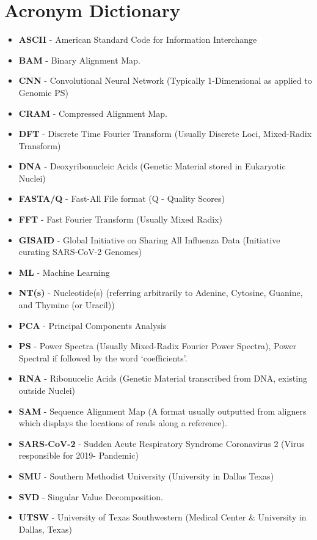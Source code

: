 \documentclass[10pt,conference]{IEEEtran}
\begin{document}
{\small
\section{Acronym Dictionary} 

\begin{itemize} 
\item \textbf{ASCII} - American Standard Code for Information Interchange
\item \textbf{BAM} - Binary Alignment Map. 
\item \textbf{CNN} - Convolutional Neural Network (Typically 1-Dimensional as applied to Genomic PS)
\item \textbf{CRAM} - Compressed Alignment Map.
\item \textbf{DFT} - Discrete Time Fourier Transform (Usually Discrete Loci, Mixed-Radix Transform)
\item \textbf{DNA} - Deoxyribonucleic Acids (Genetic Material stored in Eukaryotic Nuclei)
\item \textbf{FASTA/Q} - Fast-All File format (Q - Quality Scores)
\item \textbf{FFT} - Fast Fourier Transform (Usually Mixed Radix)
\item \textbf{GISAID} - Global Initiative on Sharing All Influenza Data (Initiative curating SARS-CoV-2 Genomes)
\item \textbf{ML} - Machine Learning
\item \textbf{NT(s)} - Nucleotide(s) (referring arbitrarily to Adenine, Cytosine, Guanine, and Thymine (or Uracil))
\item \textbf{PCA} - Principal Components Analysis
\item \textbf{PS} - Power Spectra (Usually Mixed-Radix Fourier Power Spectra), Power Spectral  if followed by the word `coefficients'. 
\item \textbf{RNA} - Ribonucelic Acids (Genetic Material transcribed from DNA, existing outside Nuclei)
\item \textbf{SAM} - Sequence Alignment Map (A format usually outputted from aligners which displays the locations of reads along a reference). 
\item \textbf{SARS-CoV-2} - Sudden Acute Respiratory Syndrome Coronavirus 2 (Virus responsible for 2019- Pandemic)
\item \textbf{SMU} - Southern Methodist University (University in Dallas Texas) 
\item \textbf{SVD} - Singular Value Decomposition.
\item \textbf{UTSW} - University of Texas Southwestern (Medical Center \& University in Dallas, Texas)
\end{itemize}
\vspace{-0.5 em}

}
\end{document}
